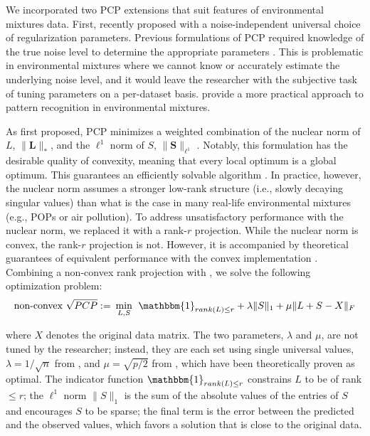 We incorporated two PCP extensions that suit features of environmental mixtures data. First, \citet{cite_zhang} recently proposed \rootpcp with a noise-independent universal choice of regularization parameters. Previous formulations of PCP required knowledge of the true noise level to determine the appropriate parameters \citep{zhou2010stable, chen2015fast, chen2020bridging}. This is problematic in environmental mixtures where we cannot know or accurately estimate the underlying noise level, and it would leave the researcher with the subjective task of tuning parameters on a per-dataset basis. \citet{cite_zhang} provide a more practical approach to pattern recognition in environmental mixtures.

As first proposed, PCP minimizes a weighted combination of the nuclear norm of $L$, $\|\boldsymbol{L}\|_{*}$, and the $\ell^1$ norm of $S$, $\|\boldsymbol{S}\|_{\ell^1}$ \citep{zhou2010stable}. Notably, this formulation has the desirable quality of convexity, meaning that every local optimum is a global optimum. This guarantees an efficiently solvable algorithm \citep{boyd2004convex}. In practice, however, the nuclear norm assumes a stronger low-rank structure (i.e., slowly decaying singular values) than what is the case in many real-life environmental mixtures (e.g., POPs or air pollution). To address unsatisfactory performance with the nuclear norm, we replaced it with a rank-$r$ projection. While the nuclear norm is convex, the rank-$r$ projection is not. However, it is accompanied by theoretical guarantees of equivalent performance with the convex implementation \citep{netrapalli2014non, chen2020bridging}. Combining a non-convex rank projection with \rootpcpc, we solve the following optimization problem:
\begin{equation}\label{eqn:ncvxroot}
\text{non-convex }\sqrt{PCP} := \hspace{0.5ex} \min _{L, S} \hspace{1ex} \mathbbm{1}_{rank(L) \le r} + \lambda\|S\|_{1} + \mu\|L+S-X\|_{F}
\end{equation}

\noindent where $X$ denotes the original data matrix. The two parameters, $\lambda$ and $\mu$, are not tuned by the researcher; instead, they are each set using single universal values, $\lambda = 1/\sqrt{n}$ from \citet{candes2011robust}, and $\mu = \sqrt{p/2}$ from \citet{cite_zhang}, which have been theoretically proven as optimal. The indicator function $\mathbbm{1}_{rank(L) \le r}$ constrains $L$ to be of rank $\le r$; the $\ell^1$ norm $\|S\|_{1}$ is the sum of the absolute values of the entries of $S$ and encourages $S$ to be sparse; the final term is the error between the predicted and the observed values, which favors a solution that is close to the original data.

